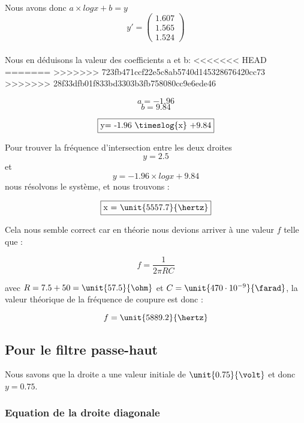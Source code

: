 \bigbreak

\\
Nous avons donc $a\times log{x} + b=y$ \Rightarrow 
$$
y'=
\begin{pmatrix}  
1.607\\
1.565\\
1.524
\end{pmatrix}
$$
\\

Nous en déduisons la valeur des coefficients a et b:  
<<<<<<< HEAD
=======
>>>>>>> 723fb471ccf22e5c8ab5740d145328676420cc73
>>>>>>> 28f33dfb01f833bd3303b3fb758080cc9e6ede46

$$a = -1.96$$
$$b= 9.84$$

$$\fbox{y= -1.96 \timeslog{x} +9.84}$$

Pour trouver la fréquence d'intersection entre les deux droites $$y=2.5$$ et $$y= -1.96 \times log{x} +9.84$$ nous résolvons le système, et nous trouvons : 

$$\fbox{x = \unit{5557.7}{\hertz}}$$ 

Cela nous semble correct car en théorie nous devions arriver à une valeur $f$ telle que : 

$$f=\frac{1}{2\pi RC}$$

avec $R= 7.5 + 50 = \unit{57.5}{\ohm}$ et $C= \unit{470 \cdot 10^{-9}}{\farad}$, la valeur théorique de la fréquence de coupure est donc :

$$f= \unit{5889.2}{\hertz}$$

\subsection{Pour le filtre passe-haut}

%   



Nous savons que la droite a une valeur initiale de $\unit{0.75}{\volt}$ et donc $y = 0.75$.

\subsubsection{Equation de la droite diagonale}


